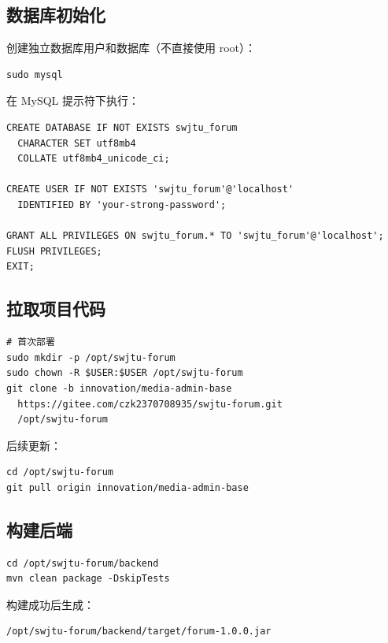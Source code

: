 \documentclass[bwprint]{report}
\begin{document}
\subsection{数据库初始化}

创建独立数据库用户和数据库（不直接使用 root）：

\begin{lstlisting}
sudo mysql
\end{lstlisting}

在 MySQL 提示符下执行：

\begin{lstlisting}
CREATE DATABASE IF NOT EXISTS swjtu_forum
  CHARACTER SET utf8mb4
  COLLATE utf8mb4_unicode_ci;

CREATE USER IF NOT EXISTS 'swjtu_forum'@'localhost'
  IDENTIFIED BY 'your-strong-password';

GRANT ALL PRIVILEGES ON swjtu_forum.* TO 'swjtu_forum'@'localhost';
FLUSH PRIVILEGES;
EXIT;
\end{lstlisting}

\subsection{拉取项目代码}

\begin{lstlisting}
# 首次部署
sudo mkdir -p /opt/swjtu-forum
sudo chown -R $USER:$USER /opt/swjtu-forum
git clone -b innovation/media-admin-base
  https://gitee.com/czk2370708935/swjtu-forum.git
  /opt/swjtu-forum
\end{lstlisting}

后续更新：

\begin{lstlisting}
cd /opt/swjtu-forum
git pull origin innovation/media-admin-base
\end{lstlisting}

\subsection{构建后端}

\begin{lstlisting}
cd /opt/swjtu-forum/backend
mvn clean package -DskipTests
\end{lstlisting}

构建成功后生成：

\begin{lstlisting}
/opt/swjtu-forum/backend/target/forum-1.0.0.jar
\end{lstlisting}
\end{document}
